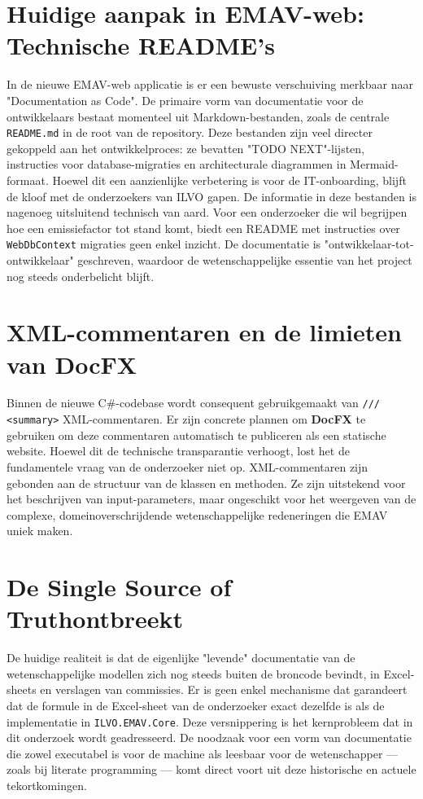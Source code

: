\section{Huidige aanpak in EMAV-web: Technische README's}
In de nieuwe EMAV-web applicatie is er een bewuste verschuiving merkbaar naar "Documentation as Code". De primaire vorm van documentatie voor de ontwikkelaars bestaat momenteel uit Markdown-bestanden, zoals de centrale \texttt{README.md} in de root van de repository. Deze bestanden zijn veel directer gekoppeld aan het ontwikkelproces: ze bevatten "TODO NEXT"-lijsten, instructies voor database-migraties en architecturale diagrammen in Mermaid-formaat.
Hoewel dit een aanzienlijke verbetering is voor de IT-onboarding, blijft de kloof met de onderzoekers van ILVO gapen. De informatie in deze bestanden is nagenoeg uitsluitend technisch van aard. Voor een onderzoeker die wil begrijpen hoe een emissiefactor tot stand komt, biedt een README met instructies over \texttt{WebDbContext} migraties geen enkel inzicht. De documentatie is "ontwikkelaar-tot-ontwikkelaar" geschreven, waardoor de wetenschappelijke essentie van het project nog steeds onderbelicht blijft.
\section{XML-commentaren en de limieten van DocFX}
Binnen de nieuwe C\#-codebase wordt consequent gebruikgemaakt van \texttt{/// <summary>} XML-commentaren. Er zijn concrete plannen om \textbf{DocFX} te gebruiken om deze commentaren automatisch te publiceren als een statische website. Hoewel dit de technische transparantie verhoogt, lost het de fundamentele vraag van de onderzoeker niet op. XML-commentaren zijn gebonden aan de structuur van de klassen en methoden. Ze zijn uitstekend voor het beschrijven van input-parameters, maar ongeschikt voor het weergeven van de complexe, domeinoverschrijdende wetenschappelijke redeneringen die EMAV uniek maken.
\section{De \textquotedbl Single Source of Truth\textquotedbl \@ ontbreekt}
De huidige realiteit is dat de eigenlijke "levende" documentatie van de wetenschappelijke modellen zich nog steeds buiten de broncode bevindt, in Excel-sheets en verslagen van commissies. Er is geen enkel mechanisme dat garandeert dat de formule in de Excel-sheet van de onderzoeker exact dezelfde is als de implementatie in \texttt{ILVO.EMAV.Core}. Deze versnippering is het kernprobleem dat in dit onderzoek wordt geadresseerd. De noodzaak voor een vorm van documentatie die zowel executabel is voor de machine als leesbaar voor de wetenschapper — zoals bij literate programming — komt direct voort uit deze historische en actuele tekortkomingen.
